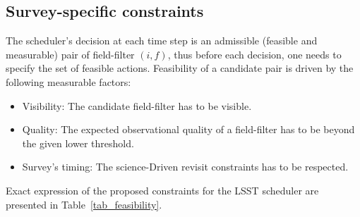 \documentclass[11pt]{article}
\theoremstyle{definition}
\begin{document}
\subsection{Survey-specific constraints}\label{sec_cstr}
The scheduler's decision at each time step is an admissible (feasible and measurable) pair of field-filter $(i,f)$, thus before each decision, one needs to specify the set of feasible actions. Feasibility of a candidate pair is driven by the following measurable factors:
\begin{itemize}
\item Visibility: The candidate field-filter has to be visible.
\item Quality: The expected observational quality of a field-filter has to be beyond the given lower threshold.
\item Survey's timing: The science-Driven revisit constraints has to be respected.
\end{itemize}
Exact expression of the proposed constraints for the LSST scheduler are presented in Table~\ref{tab_feasibility}.
\end{document}
